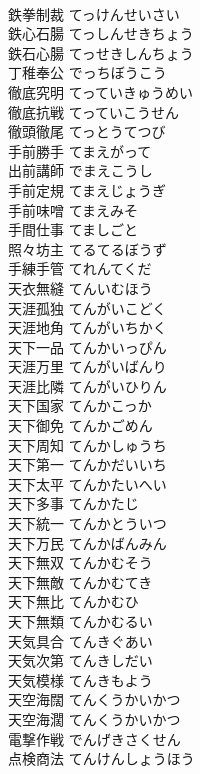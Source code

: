 \documentclass[8pt]{extreport}
\begin{document}
\begin{CJK}{UTF8}{min}
\\	鉄拳制裁	てっけんせいさい	
\\	鉄心石腸	てっしんせきちょう	
\\	鉄石心腸	てっせきしんちょう	
\\	丁稚奉公	でっちぼうこう	
\\	徹底究明	てっていきゅうめい	
\\	徹底抗戦	てっていこうせん	
\\	徹頭徹尾	てっとうてつび	
\\	手前勝手	てまえがって	
\\	出前講師	でまえこうし	
\\	手前定規	てまえじょうぎ	
\\	手前味噌	てまえみそ	
\\	手間仕事	てましごと	
\\	照々坊主	てるてるぼうず	
\\	手練手管	てれんてくだ	
\\	天衣無縫	てんいむほう	
\\	天涯孤独	てんがいこどく	
\\	天涯地角	てんがいちかく	
\\	天下一品	てんかいっぴん	
\\	天涯万里	てんがいばんり	
\\	天涯比隣	てんがいひりん	
\\	天下国家	てんかこっか	
\\	天下御免	てんかごめん	
\\	天下周知	てんかしゅうち	
\\	天下第一	てんかだいいち	
\\	天下太平	てんかたいへい	
\\	天下多事	てんかたじ	
\\	天下統一	てんかとういつ	
\\	天下万民	てんかばんみん	
\\	天下無双	てんかむそう	
\\	天下無敵	てんかむてき	
\\	天下無比	てんかむひ	
\\	天下無類	てんかむるい	
\\	天気具合	てんきぐあい	
\\	天気次第	てんきしだい	
\\	天気模様	てんきもよう	
\\	天空海闊	てんくうかいかつ	
\\	天空海濶	てんくうかいかつ	
\\	電撃作戦	でんげきさくせん	
\\	点検商法	てんけんしょうほう	

\end{CJK}
\end{document}
